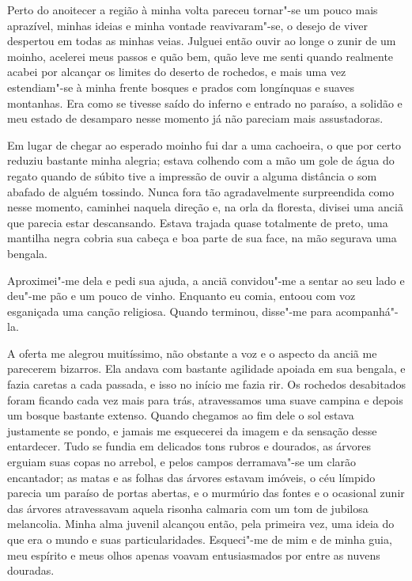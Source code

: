 Perto do anoitecer a região à minha volta pareceu tornar"-se um pouco
mais aprazível, minhas ideias e minha vontade reavivaram"-se, o desejo
de viver despertou em todas as minhas veias. Julguei então ouvir ao
longe o zunir de um moinho, acelerei meus passos e quão bem, quão leve
me senti quando realmente acabei por alcançar os limites do deserto de
rochedos, e mais uma vez estendiam"-se à minha frente bosques e prados
com longínquas e suaves montanhas. Era como se tivesse saído do inferno
e entrado no paraíso, a \mbox{solidão} e meu estado de desamparo nesse momento
já não pareciam mais assustadoras.

Em lugar de chegar ao esperado moinho fui dar a uma cachoeira, o que por
certo reduziu bastante minha alegria; estava colhendo com a mão um gole
de água do regato quando de súbito tive a impressão de ouvir a alguma
distância o som abafado de alguém tossindo. Nunca fora tão
agradavelmente surpreendida como nesse momento, caminhei naquela
direção e, na orla da floresta, divisei uma anciã que parecia estar
descansando. Estava trajada quase totalmente de preto, uma mantilha
negra cobria sua cabeça e boa parte de sua face, na mão segurava uma
bengala.

Aproximei"-me dela e pedi sua ajuda, a anciã convidou"-me a sentar ao seu
lado e deu"-me pão e um pouco de vinho. Enquanto eu comia, entoou com
voz esganiçada uma canção religiosa. Quando terminou, disse"-me para
acompanhá"-la.

A oferta me alegrou muitíssimo, não obstante a voz e o aspecto da anciã
me parecerem bizarros. Ela andava com bastante agilidade apoiada em sua
bengala, e fazia caretas a cada passada, e isso no início me fazia rir.
Os rochedos desabitados foram ficando cada vez mais para trás,
atravessamos uma suave campina e depois um bosque bastante extenso.
Quando chegamos ao fim dele o sol estava justamente se pondo, e jamais
me esquecerei da imagem e da sensação desse entardecer. Tudo se fundia
em delicados tons rubros e dourados, as árvores erguiam suas copas no
arrebol, e pelos campos derramava"-se um clarão encantador; as matas e
as folhas das árvores estavam imóveis, o céu límpido \mbox{parecia} um paraíso
de portas abertas, e o murmúrio das fontes e o ocasional zunir das
árvores atravessavam aquela risonha calmaria com um tom de jubilosa
melancolia. Minha alma juvenil alcançou então, pela primeira vez, uma
ideia do que era o mundo e suas particularidades. Esqueci"-me de mim e
de minha guia, meu espírito e meus olhos apenas voavam entusiasmados
por entre as nuvens douradas.


